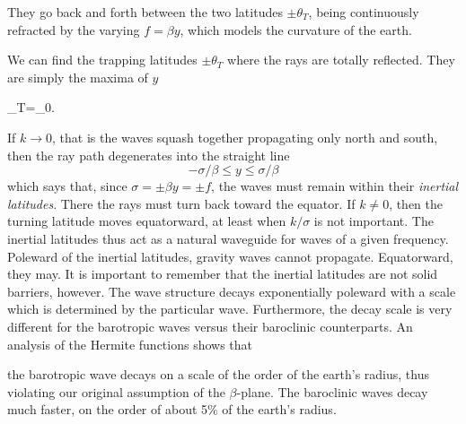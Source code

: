 
They go back and forth between the two latitudes $\pm\theta_T$, being continuously
refracted by the varying $f=\beta y$, which models the curvature of the earth.

We can find the trapping latitudes $\pm\theta_T$ where the rays are totally reflected. They
are simply the maxima of $y$
\begin{waveequation}
	\pm\theta_T=\pm{}\tan\theta_0.
\end{waveequation}

If $k\to0$, that is the waves squash together propagating only north and south, then
the ray path degenerates into the straight line
\[
	-\sigma/\beta\le y\le\sigma/\beta
\]
which says that, since $\sigma=\pm\beta y=\pm f$, the waves must remain within their
\emph{inertial latitudes}. There the rays must turn back toward the equator. If
$k\ne0$, then the turning latitude moves equatorward, at least when $k/\sigma$ is not
important. The inertial latitudes thus act as a natural waveguide for waves of a given
frequency. Poleward of the inertial latitudes, gravity waves cannot propagate.
Equatorward, they may. It is important to remember that the inertial latitudes are not
solid barriers, however. The wave structure decays exponentially poleward with a scale
which is determined by the particular wave. Furthermore, the decay scale is very
different for the barotropic waves versus their baroclinic counterparts. An analysis of
the Hermite functions shows that

\sourcepagebreak

the barotropic wave decays on a scale of the order of the earth's radius, thus violating
our original assumption of the $\beta$-plane. The baroclinic waves decay much faster,
on the order of about 5\% of the earth's radius.
